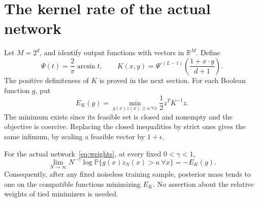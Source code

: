 \section{The kernel rate of the actual network}
Let $M=2^d$, and identify output functions with vectors in $\mathbb R^M$.
Define
\begin{equation}\label{eq:kernel}
 \Psi(t)=\frac2\pi\arcsin t,\qquad
 K(x,y)=\Psi^{\circ(L-1)}\!\left(\frac{1+x\cdot y}{d+1}\right).
\end{equation}
The positive definiteness of $K$ is proved in the next section.
For each Boolean function $g$, put
\begin{equation}\label{eq:energy}
 E_K(g)=\min_{g(x)z(x)\ge a\ \forall x}\frac12 z^TK^{-1}z.
\end{equation}
The minimum exists since its feasible set is closed and nonempty and
the objective is coercive. Replacing the closed inequalities by strict
ones gives the same infimum, by scaling a feasible vector by $1+\epsilon$.

\begin{proposition}
\label{prop:rate}
For the actual network~\eqref{eq:weights}, at every fixed
$0<\gamma<1$,
\begin{equation}\label{eq:rate}
 \lim_{N\to\infty}N^{-\gamma}\log
 \mathbb P\{g(x)z_N(x)>a\ \forall x\}=-E_K(g).
\end{equation}
Consequently, after any fixed noiseless training sample, posterior
mass tends to one on the compatible functions minimizing $E_K$.
No assertion about the relative weights of tied minimizers is needed.
\end{proposition}

